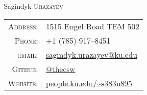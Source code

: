 \documentclass[a4paper,10pt]{article}
\begin{document}
\pagestyle{empty} %

\par{\centering
		{\Huge Sagindyk \textsc{Urazayev}
	}\bigskip\par}

      \begin{center}
        \begin{tabular}{rl}
          \textsc{Address:}   & 1515 Engel Road TEM 502 \\
          \textsc{Phone:}     & +1 (785) 917--8451\\
          \textsc{email:}     & \href{mailto:sagindyk.urazayev@ku.edu}{sagindyk.urazayev@ku.edu}\\
          \textsc{Github:} & \href{https://github.com/thecsw}{@thecsw}\\
          \textsc{Website:} & \href{http://people.ku.edu/~s383u895}{people.ku.edu/\textasciitilde{}s383u895}\\
        \end{tabular}
      \end{center}

\end{document}
